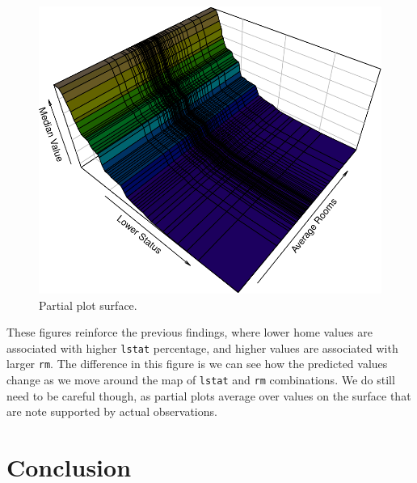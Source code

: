 \documentclass[article]{jss}
\begin{document}
\begin{CodeChunk}
\begin{figure}

{\centering \includegraphics{Regression-rfsrc_files/figure-latex/surface3d-1} 

}

\caption[Partial plot surface]{Partial plot surface.}\label{fig:surface3d}
\end{figure}
\end{CodeChunk}

These figures reinforce the previous findings, where lower home values
are associated with higher \texttt{lstat} percentage, and higher values
are associated with larger \texttt{rm}. The difference in this figure is
we can see how the predicted values change as we move around the map of
\texttt{lstat} and \texttt{rm} combinations. We do still need to be
careful though, as partial plots average over values on the surface that
are note supported by actual observations.

\hypertarget{conclusion}{%
\section{Conclusion}\label{conclusion}}
\end{document}
